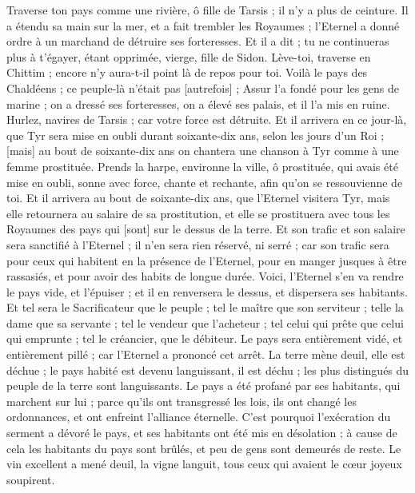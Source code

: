 \begin{multicols}{2}
Traverse ton pays comme une rivière, ô fille de Tarsis ; il n'y a plus de ceinture.
Il a étendu sa main sur la mer, et a fait trembler les Royaumes ; l'Eternel a donné ordre à un marchand de détruire ses forteresses.
Et il a dit ; tu ne continueras plus à t'égayer, étant opprimée, vierge, fille de Sidon. Lève-toi, traverse en Chittim ; encore n'y aura-t-il point là de repos pour toi.
Voilà le pays des Chaldéens ; ce peuple-là n'était pas [autrefois] ; Assur l'a fondé pour les gens de marine ; on a dressé ses forteresses, on a élevé ses palais, et il l'a mis en ruine.
Hurlez, navires de Tarsis ; car votre force est détruite.
Et il arrivera en ce jour-là, que Tyr sera mise en oubli durant soixante-dix ans, selon les jours d'un Roi ; [mais] au bout de soixante-dix ans on chantera une chanson à Tyr comme à une femme prostituée.
Prends la harpe, environne la ville, ô prostituée, qui avais été mise en oubli, sonne avec force, chante et rechante, afin qu'on se ressouvienne de toi.
Et il arrivera au bout de soixante-dix ans, que l'Eternel visitera Tyr, mais elle retournera au salaire de sa prostitution, et elle se prostituera avec tous les Royaumes des pays qui [sont] sur le dessus de la terre.
Et son trafic et son salaire sera sanctifié à l'Eternel ; il n'en sera rien réservé, ni serré ; car son trafic sera pour ceux qui habitent en la présence de l'Eternel, pour en manger jusques à être rassasiés, et pour avoir des habits de longue durée.
\VerseOne{}Voici, l'Eternel s'en va rendre le pays vide, et l'épuiser ; et il en renversera le dessus, et dispersera ses habitants.
Et tel sera le Sacrificateur que le peuple ; tel le maître que son serviteur ; telle la dame que sa servante ; tel le vendeur que l'acheteur ; tel celui qui prête que celui qui emprunte ; tel le créancier, que le débiteur.
Le pays sera entièrement vidé, et entièrement pillé ; car l'Eternel a prononcé cet arrêt.
La terre mène deuil, elle est déchue ; le pays habité est devenu languissant, il est déchu ; les plus distingués du peuple de la terre sont languissants.
Le pays a été profané par ses habitants, qui marchent sur lui ; parce qu'ils ont transgressé les lois, ils ont changé les ordonnances, et ont enfreint l'alliance éternelle.
C'est pourquoi l'exécration du serment a dévoré le pays, et ses habitants ont été mis en désolation ; à cause de cela les habitants du pays sont brûlés, et peu de gens sont demeurés de reste.
Le vin excellent a mené deuil, la vigne languit, tous ceux qui avaient le cœur joyeux soupirent.

\end{multicols}
